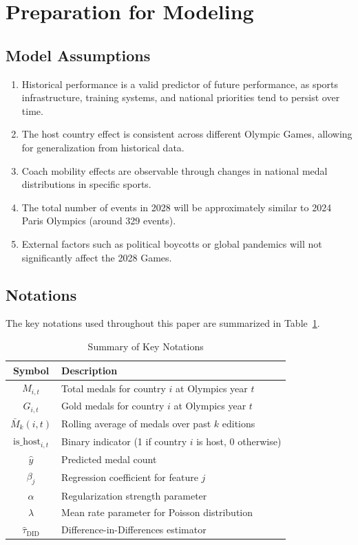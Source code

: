 \documentclass{mcmthesis}
\begin{document}
\section{Preparation for Modeling}
\subsection{Model Assumptions}
\begin{enumerate}
    \item Historical performance is a valid predictor of future performance, as sports infrastructure, training systems, and national priorities tend to persist over time.
    \item The host country effect is consistent across different Olympic Games, allowing for generalization from historical data.
    \item Coach mobility effects are observable through changes in national medal distributions in specific sports.
    \item The total number of events in 2028 will be approximately similar to 2024 Paris Olympics (around 329 events).
    \item External factors such as political boycotts or global pandemics will not significantly affect the 2028 Games.
\end{enumerate}

\subsection{Notations}
The key notations used throughout this paper are summarized in Table~\ref{tab:notations}.

\begin{table}[htbp]
\centering
\caption{Summary of Key Notations}
\label{tab:notations}
\begin{tabular}{cl}
\toprule
\textbf{Symbol} & \textbf{Description} \\
\midrule
$M_{i,t}$ & Total medals for country $i$ at Olympics year $t$ \\
$G_{i,t}$ & Gold medals for country $i$ at Olympics year $t$ \\
$\bar{M}_{k}(i,t)$ & Rolling average of medals over past $k$ editions \\
$\text{is\_host}_{i,t}$ & Binary indicator (1 if country $i$ is host, 0 otherwise) \\
$\hat{y}$ & Predicted medal count \\
$\beta_j$ & Regression coefficient for feature $j$ \\
$\alpha$ & Regularization strength parameter \\
$\lambda$ & Mean rate parameter for Poisson distribution \\
$\hat{\tau}_{\text{DID}}$ & Difference-in-Differences estimator \\
\bottomrule
\end{tabular}
\end{table}
\end{document}
